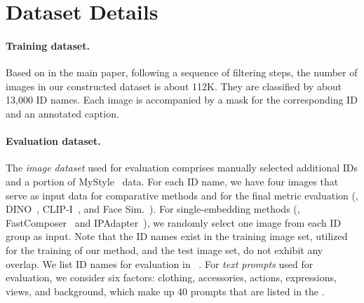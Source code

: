 \clearpage
\setcounter{page}{1}
\setcounter{section}{0}
\makearxivsupplementary

\renewcommand\thesection{\Alph{section}}
\section{Dataset Details}

\paragraph{Training dataset.}
Based on  in the main paper,
following a sequence of filtering steps,
the number of images in our constructed dataset is about 112K.
They are classified by about 13,000 ID names.
Each image is accompanied by a mask for the corresponding ID and an annotated caption.


\paragraph{Evaluation dataset.}
The \textit{image dataset} used for evaluation comprises manually selected additional IDs and a portion of MyStyle~\cite{nitzan2022mystyle} data. 
For each ID name, we have four images that serve as input data for comparative methods and for the final metric evaluation (\ie, DINO~\cite{caron2021emerging}, CLIP-I~\cite{gal2022image}, and Face Sim.~\cite{deng2019arcface}).
For single-embedding methods (\ie, FastComposer~\cite{xiao2023fastcomposer} and IPAdapter~\cite{ye2023ip}), we randomly select one image from each ID group as input. 
Note that the ID names exist in the training image set, utilized for the training of our method, and the test image set, do not exhibit any overlap.
We list ID names for evaluation in ~.
For \textit{text prompts} used for evaluation,  we consider six factors: clothing, accessories, actions, expressions, views, and background, which make up 40 prompts that are listed in the .

